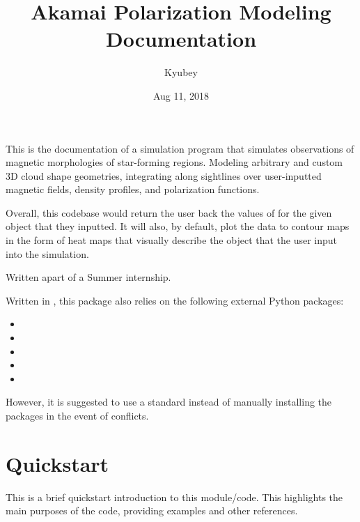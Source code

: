 \documentclass[letterpaper,10pt,english]{sphinxmanual}
\title{Akamai Polarization Modeling Documentation}
\date{Aug 11, 2018}
\author{Kyubey}
\begin{document}
\maketitle
\sphinxtableofcontents
{}\label{\detokenize{index::doc}}


This is the documentation of a simulation program that simulates observations of magnetic morphologies of star-forming regions. Modeling arbitrary and custom 3D cloud shape geometries, integrating along sightlines over user-inputted magnetic fields, density profiles, and polarization functions.

Overall, this codebase would return the user back the values of  for the given object that they inputted. It will also, by default, plot the data to contour maps in the form of heat maps that visually describe the object that the user input into the simulation.

Written apart of a  Summer internship.

Written in , this package also relies on the following external Python packages:
\begin{itemize}
\item {} 

\item {} 

\item {} 

\item {} 

\item {} 

\end{itemize}

However, it is suggested to use a standard  instead of manually installing the packages in the event of conflicts.


\chapter{Quickstart}
\label{\detokenize{quickstart:quickstart}}\label{\detokenize{quickstart::doc}}
This is a brief quickstart introduction to this module/code. This highlights the main purposes of the code, providing examples and other references.
\end{document}
